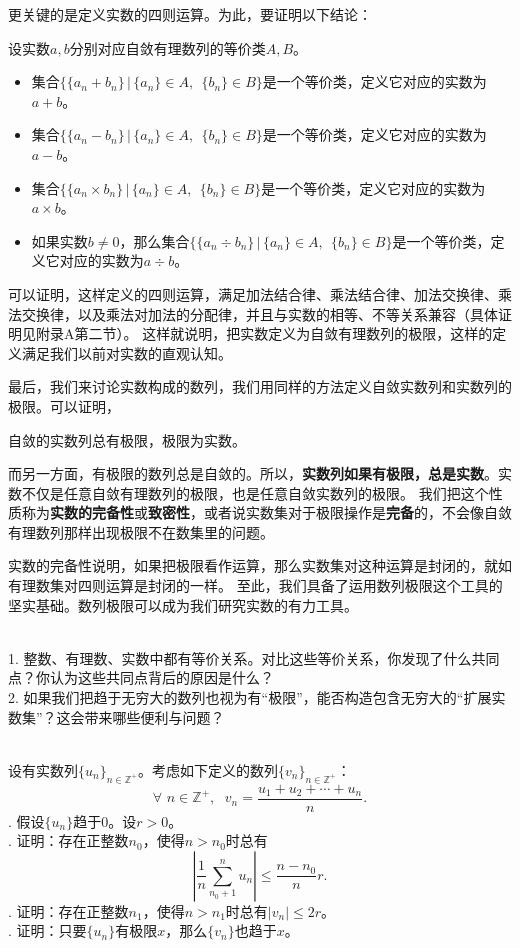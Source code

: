 \documentclass[12pt,UTF8]{ctexbook}
\begin{document}
更关键的是定义实数的四则运算。为此，要证明以下结论：
\begin{tm}
    设实数$a,b$分别对应自敛有理数列的等价类$A,B$。
    \begin{itemize}
        \item 集合$\{\{a_n + b_n\} \, | \, \{a_n\}\in A,\;\, \{b_n\}\in B\}$是一个等价类，定义它对应的实数为$a + b$。
        \item 集合$\{\{a_n - b_n\} \, | \, \{a_n\}\in A,\;\, \{b_n\}\in B\}$是一个等价类，定义它对应的实数为$a - b$。
        \item 集合$\{\{a_n \times b_n\} \, | \, \{a_n\}\in A,\;\, \{b_n\}\in B\}$是一个等价类，定义它对应的实数为$a \times b$。
        \item 如果实数$b\neq 0$，那么集合$\{\{a_n \div b_n\} \, | \, \{a_n\}\in A,\;\, \{b_n\}\in B\}$是一个等价类，定义它对应的实数为$a \div b$。
    \end{itemize}  
\end{tm}
可以证明，这样定义的四则运算，满足加法结合律、乘法结合律、加法交换律、乘法交换律，以及乘法对加法的分配律，并且与实数的相等、不等关系兼容（具体证明见附录A第二节）。
这样就说明，把实数定义为自敛有理数列的极限，这样的定义满足我们以前对实数的直观认知。

最后，我们来讨论实数构成的数列，我们用同样的方法定义自敛实数列和实数列的极限。可以证明，
\begin{tm}
    自敛的实数列总有极限，极限为实数。
\end{tm}
而另一方面，有极限的数列总是自敛的。所以，\textbf{实数列如果有极限，总是实数}。实数不仅是任意自敛有理数列的极限，也是任意自敛实数列的极限。
我们把这个性质称为\textbf{实数的完备性}或\textbf{致密性}，或者说实数集对于极限操作是\textbf{完备}的，不会像自敛有理数列那样出现极限不在数集里的问题。

实数的完备性说明，如果把极限看作运算，那么实数集对这种运算是封闭的，就如有理数集对四则运算是封闭的一样。
至此，我们具备了运用数列极限这个工具的坚实基础。数列极限可以成为我们研究实数的有力工具。

\begin{sk}
    \mbox{}\\
    1. 整数、有理数、实数中都有等价关系。对比这些等价关系，你发现了什么共同点？你认为这些共同点背后的原因是什么？\\
    2. 如果我们把趋于无穷大的数列也视为有“极限”，能否构造包含无穷大的“扩展实数集”？这会带来哪些便利与问题？
\end{sk}

\begin{xt}
    \mbox{} \\
    设有实数列$\{u_n\}_{n\in\mathbb{Z}^+}$。考虑如下定义的数列$\{v_n\}_{n\in\mathbb{Z}^+}$：
    $$ \forall \,\, n\in\mathbb{Z}^+, \;\,\, v_n = \frac{u_1 + u_2 + \cdots + u_n}{n}. $$
    . 假设$\{u_n\}$趋于$0$。设$r>0$。\\
    . 证明：存在正整数$n_0$，使得$n>n_0$时总有
    $$ \left| \frac{1}{n} \sum_{n_0+1}^n u_n \right| \leqslant \frac{n-n_0}{n}r.$$
    . 证明：存在正整数$n_1$，使得$n>n_1$时总有$|v_n| \leqslant 2r$。\\
    . 证明：只要$\{u_n\}$有极限$x$，那么$\{v_n\}$也趋于$x$。
\end{xt}
\end{document}
